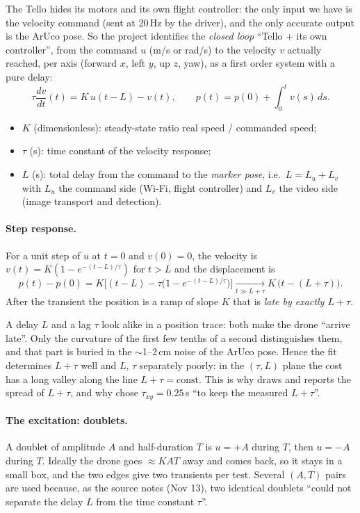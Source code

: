 The Tello hides its motors and its own flight controller: the only input we have is the  velocity
command (sent at 20\,Hz by the driver), and the only accurate output is the ArUco pose. So the project identifies
the \emph{closed loop} ``Tello + its own controller'', from the command $u$ (m/s or rad/s) to the velocity $v$
actually reached, per axis (forward $x$, left $y$, up $z$, yaw), as a first order system with a pure delay:
$$
\tau \frac{dv}{dt}(t) = K\,u(t-L) - v(t), \qquad p(t) = p(0) + \int_0^t v(s)\,ds .
$$
\begin{itemize}[nosep]
\item $K$ (dimensionless): steady-state ratio real speed / commanded speed;
\item $\tau$ (s): time constant of the velocity response;
\item $L$ (s): total delay from the command to the \emph{marker pose}, i.e.\ $L = L_u + L_v$ with $L_u$ the
command side (Wi-Fi, flight controller) and $L_v$ the video side (image transport and detection).
\end{itemize}

\paragraph{Step response.} For a unit step of $u$ at $t=0$ and $v(0)=0$, the velocity is
$v(t) = K(1-e^{-(t-L)/\tau})$ for $t>L$ and the displacement is
$$
p(t) - p(0) = K\Big[(t-L) - \tau\big(1 - e^{-(t-L)/\tau}\big)\Big] \xrightarrow[t \gg L+\tau]{} K\,\big(t - (L+\tau)\big).
$$
After the transient the position is a ramp of slope $K$ that is \emph{late by exactly $L+\tau$}.

\begin{intuition}
A delay $L$ and a lag $\tau$ look alike in a position trace: both make the drone ``arrive late''. Only the
curvature of the first few tenths of a second distinguishes them, and that part is buried in the
$\sim$1--2\,cm noise of the ArUco pose. Hence the fit determines $L+\tau$ well and $L$, $\tau$ separately
poorly: in the $(\tau, L)$ plane the cost has a long valley along the line $L+\tau = \text{const}$.
This is why  draws  and reports the spread of $L+\tau$, and why
 chose $\tau_{xy}=0.25$\,s ``to keep the measured $L+\tau$''.
\end{intuition}

\paragraph{The excitation: doublets.} A doublet of amplitude $A$ and half-duration $T$ is $u=+A$ during $T$,
then $u=-A$ during $T$. Ideally the drone goes $\approx KAT$ away and comes back, so it stays in a small box,
and the two edges give two transients per test. Several $(A,T)$ pairs are used because, as the source notes
(Nov 13), two identical doublets ``could not separate the delay $L$ from the time constant $\tau$''.

